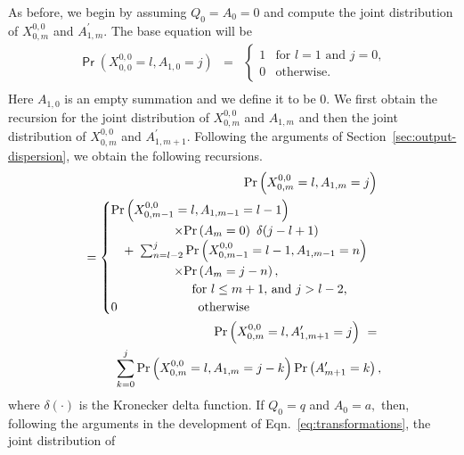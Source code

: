 \documentclass[11pt]{article}
\newcommand{\prob}[1]{\mathsf{\Pr}\left(#1\right)}
\begin{document}
As before, we begin by assuming $Q_0=A_0=0$ and compute the joint
distribution of $X_{0,m}^{0,0}$ and $A_{1,m}^\prime.$ The base
equation will be
\begin{eqnarray}
  \prob{X_{0,0}^{0,0} = l, A_{1,0} = j} &=& 
  \begin{cases} 
    1 & \mbox{for $l=1$ and $j=0$,}\\
    0 & \mbox{otherwise.}
  \end{cases} \nonumber \\
  \label{eq:base-equations-prime}
\end{eqnarray}
Here $A_{1,0}$ is an empty summation and we define it to be 0.  We
first obtain the recursion for the joint distribution of
$X^{0,0}_{0,m}$ and $A_{1,m}$ and then the joint distribution of
$X^{0,0}_{0,m}$ and $A^\prime_{1,m+1}.$ Following the arguments of
Section~\ref{sec:output-dispersion}, we obtain the following
recursions.
\begin{eqnarray}
  && \hspace{-0.2in}\prob{X_{0,m}^{0,0}=l , A_{1,m}=j }  \ \nonumber \\
  && \hspace*{-.1in} =
  \begin{cases}
    \prob{X_{0,m-1}^{0,0}=l , A_{1,m-1}=l-1 }  \\
    \hspace{0.7in} \times \prob{A_m=0} \ \delta(j-l+1)  \\
    \hspace{0.1in} \ + \ \sum_{n=l-2}^j \prob{X_{0,m-1}^{0,0}=l-1,
      A_{1,m-1}=n} \\
    \hspace{0.7in} \times \prob{A_m=j-n} ,\\
    \hspace{0.9in} \mbox{for $l \leq m+1,$ and $j > l-2$,} \\
    0  \hspace{0.9in} \mbox{otherwise}
  \end{cases} \\
  &&\hspace{-0.2in}\prob{X_{0,m}^{0,0}=l , A^\prime_{1,m+1}=j }  \ = \
  \nonumber \\ 
  && \sum_{k=0}^j \prob{X_{0,m}^{0,0}=l , A_{1,m}=j-k }
  \prob{A^\prime_{m+1} =k} , 
  \label{eq:recursions-prime}
\end{eqnarray}
where $\delta(\cdot)$ is the Kronecker delta function. If $Q_0 =q$ and
$A_0=a,$ then, following the arguments in the development of
Eqn.~\ref{eq:transformations}, the joint distribution of
\end{document}
